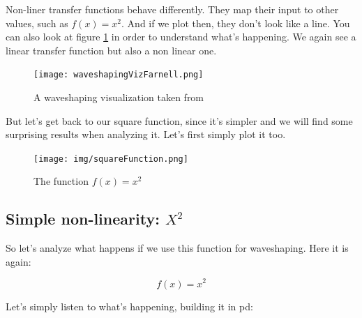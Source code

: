 Non-liner transfer functions behave differently. They map their input to other values, such as $f(x) = x^2$. And if we plot then, they don't look like a line.  You can also look at figure \ref{fig:farnellWaveShaping} in order to understand what's happening. We again see a linear transfer function but also a non linear one.
\begin{figure}[H]
	\centering
	\texttt{[image: waveshapingVizFarnell.png]}
	\caption[farnell wave shaping visualization]
	{A waveshaping visualization taken from \cite{farnell_designing_2010}}
	\label{fig:farnellWaveShaping}
\end{figure}

But let's get back to our square function, since it's simpler and we will find some surprising results when analyzing it. Let's first simply plot it too.


\begin{figure}[H]
	\begin{center}
		\texttt{[image: img/squareFunction.png]}
		\caption{The function $f(x)=x^2$}
		\label{fig:square}
	\end{center}
\end{figure}



\subsection{Simple non-linearity: \(X ^2\)} %
\label{sub:nonLinearTrans}

So let's analyze what happens if we use this function for waveshaping. Here it is again:

\begin{equation}
f(x) = x ^ 2
\end{equation}



Let's simply listen to what's happening, building it in pd:

